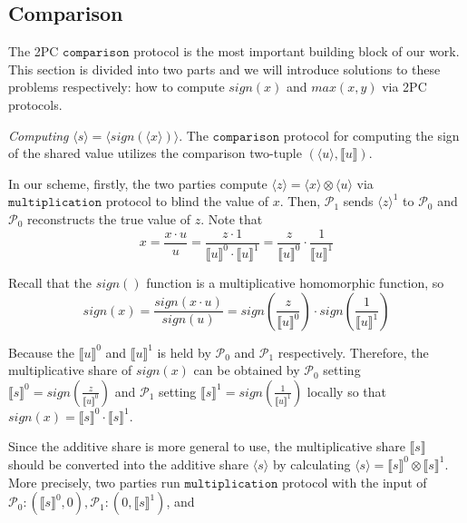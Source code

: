 \documentclass[letterpaper]{article} %
\begin{document}
    \subsection{Comparison}
    The 2PC $\mathtt{comparison}$ protocol is the most important building block of our work.
    This section is divided into two parts and we will introduce solutions to these problems respectively: 
    how to compute $sign(x)$ and $max(x,y)$ via 2PC protocols.
    
    \emph{Computing} $\langle s\rangle  = \langle sign(\langle x\rangle)\rangle $. 
    The $\mathtt{comparison}$ protocol for computing the sign of the shared value utilizes the comparison two-tuple $(\langle u\rangle,\llbracket u \rrbracket )$.
    
    In our scheme, firstly, the two parties compute $ \langle z\rangle = \langle x\rangle\otimes \langle u\rangle$ via $\mathtt{multiplication}$ protocol
    to blind the value of $x$.
    Then, $\mathcal{P}_{1}$ sends  $ \langle z\rangle^{1}$ to $\mathcal{P}_{0}$ and 
    $\mathcal{P}_{0}$ reconstructs the true value of $z$.
    Note that 
    $$x=\frac{x\cdot u}{u} 
        =\frac{z\cdot 1}{\llbracket u \rrbracket^{0}\cdot \llbracket u \rrbracket^{1}}
        =\frac{z}{\llbracket u \rrbracket^{0}}\cdot\frac{1}{\llbracket u \rrbracket^{1}}$$

    Recall that the $sign()$ function is a multiplicative homomorphic function, so
    $$sign(x)=\frac{sign(x \cdot u)}{sign(u)}
    =sign(\frac{z}{\llbracket u \rrbracket^{0}})
    \cdot sign(\frac{1}{\llbracket u \rrbracket^{1}})$$
    
    
    
    Because the $\llbracket u \rrbracket^{0}$ and $\llbracket u \rrbracket^{1}$
    is held by $\mathcal{P}_{0}$ and $\mathcal{P}_{1}$ respectively.
    Therefore, the multiplicative share of $sign(x)$ can be obtained by
    $\mathcal{P}_{0}$ setting $\llbracket s \rrbracket^{0}
    =sign(\frac{z}{\llbracket u \rrbracket^{0}})$
    and $\mathcal{P}_{1}$ setting $\llbracket s \rrbracket^{1}
    =sign(\frac{1}{\llbracket u \rrbracket^{1}})$ locally
    so that $sign(x)=\llbracket s \rrbracket^{0}\cdot \llbracket s \rrbracket^{1}$.

    Since the additive share is more general to use, 
    the multiplicative share $\llbracket s \rrbracket$ should be converted into the additive share $\langle s\rangle$
    by calculating $\langle s\rangle = \llbracket s \rrbracket ^{0}\otimes \llbracket s \rrbracket ^{1}$.
    More precisely, two parties run $\mathtt{multiplication}$ protocol with the input of 
    $\mathcal{P}_{0}:(\llbracket s \rrbracket ^{0},0),\mathcal{P}_{1}:(0,\llbracket s \rrbracket ^{1})$, and 
\end{document}
